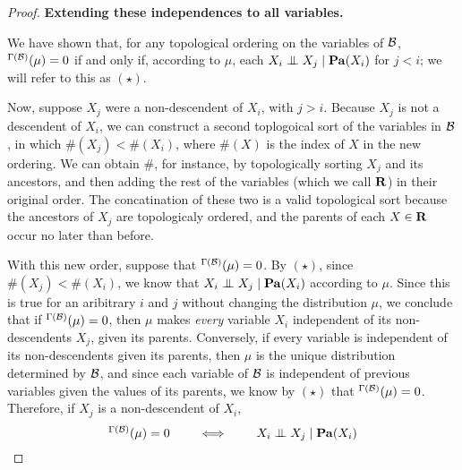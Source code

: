 \documentclass{article}
\theoremstyle{plain}
\theoremstyle{definition}
\theoremstyle{remark}
\let\H\relax
\DeclareMathOperator{\H}{\mathrm{H}} %
\newcommand{\CI}{\mathrel{\perp\mspace{-10mu}\perp}} %
\newcommand\Pa{\mathbf{Pa}}
\newcommand\PDGof{\Gamma}
\numberwithin{equation}{section}
\begin{document}
\begin{proof}
		\textbf{Extending these independences to all variables.}
		
		We have shown that, for any topological ordering on the variables of $\cal B$, $\H^{\PDGof(\cal B)}(\mu) = 0$ if and only if, according to $\mu$,  each $X_i \CI X_j \mid \Pa(X_i)$ for $j  < i$; we will refer to this as $(\star)$.
		
		Now, suppose $X_j$ were a non-descendent of $X_i$, with $j > i$. Because $X_j$ is not a descendent of $X_i$, we can construct a second toplogoical sort of the variables in $\cal B$, in which $\#(X_j) < \#(X_i)$, where $\#(X)$ is the index of $X$ in the new ordering. 
		We can obtain $\#$, for instance, by topologically sorting $X_j$ and its ancestors, and then adding the rest of the variables (which we call $\bf R$) in their original order. The concatination of these two is a valid topological sort because the ancestors of $X_j$ are topologicaly ordered, and the parents of each $X \in \bf R$ occur no later than before.
		
		
		With this new order, suppose that $\H^{\PDGof(\cal B)}(\mu) = 0$. By $(\star)$, since $\#(X_j) < \#(X_i)$, we know that $X_i \CI X_j \mid \Pa(X_i)$ according to $\mu$. Since this is true for an aribitrary $i$ and $j$ without changing the distribution $\mu$, we conclude that if $\H^{\PDGof(\cal B)}(\mu) = 0$, then $\mu$ makes \emph{every} variable $X_i$ independent of its non-descendents $X_j$, given its parents.
		Conversely, if every variable is independent of its non-descendents given its parents, then $\mu$ is the unique distribution determined by $\cal B$, and since each variable of $\cal B$ is independent of previous variables given the values of its parents,  we know by $(\star)$ that $\H^{\PDGof(\cal B)}(\mu) = 0$. Therefore, if $X_j$ is a non-descendent of $X_i$, 
		\[ \H^{\PDGof(\cal B)}(\mu) = 0 \qquad\iff\qquad X_i \CI X_j \mid \Pa(X_i) \] 
		

\end{proof}
\end{document}
